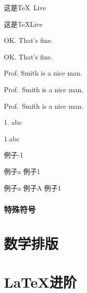 \documentclass{ctexart}
\begin{document}
            这是\TeX\ Live %

            这是\TeX\space Live %

            OK. That's fine. %

            OK\@. That's fine. %

            Prof. Smith is a nice man. %

            Prof.\ Smith is a nice man. 

            Prof.~Smith is a nice man.

            1. abc

            1.\frenchspacing abc

            例子-1

            例子a 例子1
            
            \mbox{例子}a 例子\mbox{A} \mbox{例子}\mbox{1}

        \subsubsection{特殊符号}

\section{数学排版}

\section{\LaTeX 进阶}
\end{document}
